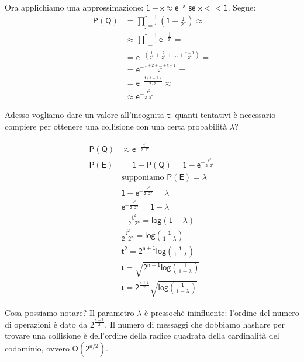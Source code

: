 \documentclass{article}
\begin{document}
Ora applichiamo una approssimazione: $\mathsf{1-x \approx e^{-x} \text{ se } x << 1}$. Segue:
\begin{align*}
    \mathsf{P(Q)} &= \mathsf{\prod_{j=1}^{t-1} \left(1 - \frac{j}{2^n} \right)} \approx \\
    &\approx \mathsf{\prod_{j=1}^{t-1} e^{- \frac{j}{2^n}}} = \\ 
    &= \mathsf{ e^{- \left( \frac{1}{2^n} + \frac{2}{2^n} + \dots + \frac{t-1}{2^n} \right) } } = \\
    &= \mathsf{ e^{- \frac{1 + 2 + \dots + t-1}{2^n} }} = \\
    &= \mathsf{ e^{- \frac{t(t-1)}{2 \cdot 2^n} }} \approx \\ 
    &\approx \mathsf{ e^{- \frac{t^2}{2 \cdot 2^n} }} 
\end{align*}

\noindent Adesso vogliamo dare un valore all'incognita $\mathsf{t}$: quanti tentativi è necessario compiere 
per ottenere una collisione con una certa probabilità $\mathsf{\lambda}$?

\begin{align*}
    \mathsf{P(Q)} &\approx \mathsf{ e^{- \frac{t^2}{2 \cdot 2^n} }}                   \\ 
    \mathsf{P(E)} &= \mathsf{1 - P(Q)} = \mathsf{ 1 - e^{- \frac{t^2}{2 \cdot 2^n} }} \\
    & \text{supponiamo } \mathsf{P(E) = \lambda}                                      \\
    &\mathsf{ 1 - e^{- \frac{t^2}{2 \cdot 2^n} }} = \mathsf{\lambda}                  \\
    &\mathsf{e^{- \frac{t^2}{2 \cdot 2^n} }} = \mathsf{1 - \lambda}                   \\
    &\mathsf{- \frac{t^2}{2 \cdot 2^n} } = \mathsf{log(1 - \lambda)}                  \\
    &\mathsf{\frac{t^2}{2 \cdot 2^n} } = \mathsf{log(\frac{1}{1 - \lambda})}          \\
    &\mathsf{t^2} = \mathsf{2^{n+1} log(\frac{1}{1 - \lambda})}                       \\
    &\mathsf{t} = \mathsf{\sqrt{ 2^{n+1} log(\frac{1}{1 - \lambda}) }}                \\
    &\mathsf{t} = \mathsf{2^{\frac{n+1}{2}} \sqrt{log(\frac{1}{1 - \lambda})}}
\end{align*}

\noindent Cosa possiamo notare? Il parametro $\mathsf{\lambda}$ è pressochè ininfluente: l'ordine del numero di 
operazioni è dato da $\mathsf{2^{\frac{n+1}{2}}}$. Il numero di messaggi che dobbiamo hashare per trovare una 
collisione è dell'ordine della radice quadrata della cardinalità del codominio, ovvero $\mathsf{O(2^{n/2})}$.
\end{document}

